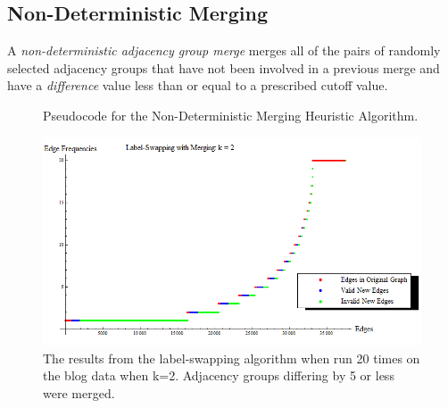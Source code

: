 \subsection{Non-Deterministic Merging}

\begin{dfn}
A \emph{non-deterministic adjacency group merge} merges all of the pairs of randomly selected adjacency groups that have not been involved in a previous merge and have a \emph{difference} value less than or equal to a prescribed cutoff value.
\end{dfn}

\begin{figure}[htb]
	\begin{algorithmic}
		\renewcommand{\algorithmicrequire}{\textbf{Input:}}
		\renewcommand{\algorithmicensure}{\textbf{Output:}}
			\EndIf
				\EndIf
				\EndIf
			\EndFor
			\EndIf
		\EndFor		
	\end{algorithmic}
	\caption{Pseudocode for the Non-Deterministic Merging Heuristic Algorithm.}
	\label{fig:non-deterministic-merging}
\end{figure}

\begin{figure}[ht]
  \centering
  \includegraphics[scale=0.8 ]{s40_k_2_det.png}
  \caption{The results from the label-swapping algorithm when run 20 times on the blog data when k=2. Adjacency groups differing by 5 or less were merged.}
  \label{fig:s40-k=2-merge}
\end{figure}

